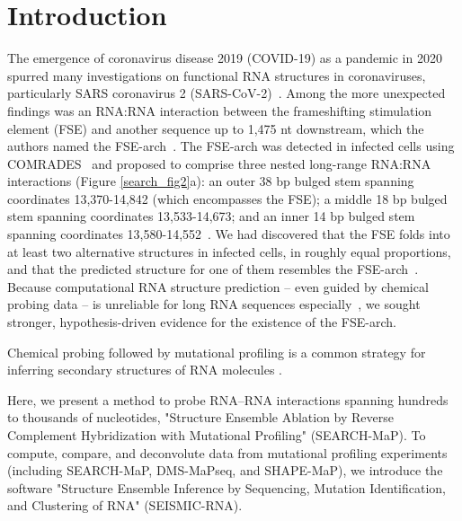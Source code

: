 \documentclass[main.tex]{subfiles}
\begin{document}
\section{Introduction}
\label{intro}

The emergence of coronavirus disease 2019 (COVID-19) as a pandemic in 2020 spurred many investigations on functional RNA structures in coronaviruses, particularly SARS coronavirus 2 (SARS-CoV-2)~\cite{Rangan2020,Manfredonia2020,Ziv2020,LSun2021,YanZhang2021,Huston2021,Rangan2021,Morandi2021,Yang2021,Lan2022}. Among the more unexpected findings was an RNA:RNA interaction between the frameshifting stimulation element (FSE) and another sequence up to 1,475 nt downstream, which the authors named the FSE-arch~\cite{Ziv2020}. The FSE-arch was detected in infected cells using COMRADES~\cite{Ziv2018} and proposed to comprise three nested long-range RNA:RNA interactions (Figure \ref{search_fig2}a): an outer 38 bp bulged stem spanning coordinates 13,370-14,842 (which encompasses the FSE); a middle 18 bp bulged stem spanning coordinates 13,533-14,673; and an inner 14 bp bulged stem spanning coordinates 13,580-14,552~\cite{Ziv2020}. We had discovered that the FSE folds into at least two alternative structures in infected cells, in roughly equal proportions, and that the predicted structure for one of them resembles the FSE-arch~\cite{Lan2022}. Because computational RNA structure prediction -- even guided by chemical probing data -- is unreliable for long RNA sequences especially~\cite{Aviran2022}, we sought stronger, hypothesis-driven evidence for the existence of the FSE-arch.


Chemical probing followed by mutational profiling is a common strategy for inferring secondary structures of RNA molecules \cite{Zubradt2016, Siegfried2014}.




Here, we present a method to probe RNA--RNA interactions spanning hundreds to thousands of nucleotides, "Structure Ensemble Ablation by Reverse Complement Hybridization with Mutational Profiling" (SEARCH-MaP).
To compute, compare, and deconvolute data from mutational profiling experiments (including SEARCH-MaP, DMS-MaPseq, and SHAPE-MaP), we introduce the software "Structure Ensemble Inference by Sequencing, Mutation Identification, and Clustering of RNA" (SEISMIC-RNA).
\end{document}
